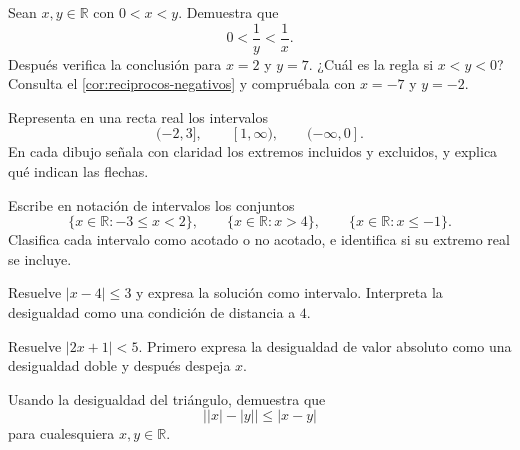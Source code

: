 \begin{samepage}
\begin{problem}
Sean $x,y\in\mathbb{R}$ con $0<x<y$. Demuestra que
\[
0<\frac1y<\frac1x.
\]
Después verifica la conclusión para $x=2$ y $y=7$.
¿Cuál es la regla si $x<y<0$? Consulta el \cref{cor:reciprocos-negativos} y compruébala con $x=-7$ y $y=-2$.
\end{problem}
\end{samepage}
\par{}

\begin{samepage}
\begin{problem}
Representa en una recta real los intervalos
\[
(-2,3],\qquad [1,\infty),\qquad (-\infty,0].
\]
En cada dibujo señala con claridad los extremos incluidos y excluidos, y explica qué indican las flechas.
\end{problem}
\end{samepage}
\par{}

\begin{samepage}
\begin{problem}
Escribe en notación de intervalos los conjuntos
\[
\{x\in\mathbb{R}:-3\leq x<2\},\qquad
\{x\in\mathbb{R}:x>4\},\qquad
\{x\in\mathbb{R}:x\leq-1\}.
\]
Clasifica cada intervalo como acotado o no acotado, e identifica si su extremo real se incluye.
\end{problem}
\end{samepage}
\par{}

\begin{samepage}
\begin{problem}
Resuelve $|x-4|\leq3$ y expresa la solución como intervalo. Interpreta la desigualdad como una condición de distancia a $4$.
\end{problem}
\end{samepage}
\par{}

\begin{samepage}
\begin{problem}
Resuelve $|2x+1|<5$. Primero expresa la desigualdad de valor absoluto como una desigualdad doble y después despeja $x$.
\end{problem}
\end{samepage}
\par{}

\begin{samepage}
\begin{problem}
Usando la desigualdad del triángulo, demuestra que
\[
\bigl||x|-|y|\bigr|\leq|x-y|
\]
para cualesquiera $x,y\in\mathbb{R}$.
\end{problem}
\end{samepage}
\par{}

